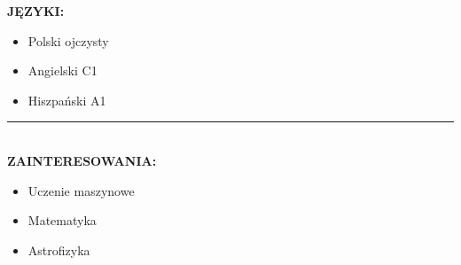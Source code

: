 \documentclass[10pt]{article}
\begin{document}
\noindent \fontsize{14pt}{14pt}\selectfont \textbf{\color{Violet}JĘZYKI:}
\fontsize{10pt}{10pt}\selectfont
\begin{itemize}[leftmargin=*]
    \item Polski ojczysty
    \item Angielski C1
    \item Hiszpański A1
\end{itemize}
\rule{17cm}{1pt} \\

\noindent \fontsize{14pt}{14pt}\selectfont \textbf{\color{Violet}ZAINTERESOWANIA:}
\fontsize{10pt}{10pt}\selectfont
\begin{itemize}[leftmargin=*]
    \item Uczenie maszynowe
    \item Matematyka
    \item Astrofizyka
\end{itemize}
\end{document}
